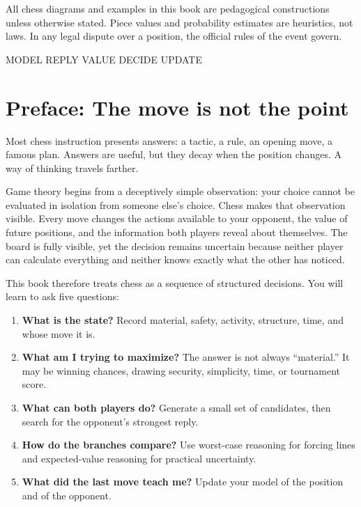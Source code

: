 All chess diagrams and examples in this book are pedagogical constructions unless otherwise stated. Piece values and probability estimates are heuristics, not laws. In any legal dispute over a position, the official rules of the event govern.

\vfill
\begin{center}
{\sffamily\small\color{Teal}MODEL \quad REPLY \quad VALUE \quad DECIDE \quad UPDATE}
\end{center}
\cleardoublepage

\chapter*{Preface: The move is not the point}

Most chess instruction presents answers: a tactic, a rule, an opening move, a famous plan. Answers are useful, but they decay when the position changes. A way of thinking travels farther.

Game theory begins from a deceptively simple observation: your choice cannot be evaluated in isolation from someone else's choice. Chess makes that observation visible. Every move changes the actions available to your opponent, the value of future positions, and the information both players reveal about themselves. The board is fully visible, yet the decision remains uncertain because neither player can calculate everything and neither knows exactly what the other has noticed.

This book therefore treats chess as a sequence of structured decisions. You will learn to ask five questions:

\begin{enumerate}[label=\textbf{\arabic*.},leftmargin=2.2em]
\item \textbf{What is the state?} Record material, safety, activity, structure, time, and whose move it is.
\item \textbf{What am I trying to maximize?} The answer is not always ``material.'' It may be winning chances, drawing security, simplicity, time, or tournament score.
\item \textbf{What can both players do?} Generate a small set of candidates, then search for the opponent's strongest reply.
\item \textbf{How do the branches compare?} Use worst-case reasoning for forcing lines and expected-value reasoning for practical uncertainty.
\item \textbf{What did the last move teach me?} Update your model of the position and of the opponent.
\end{enumerate}

